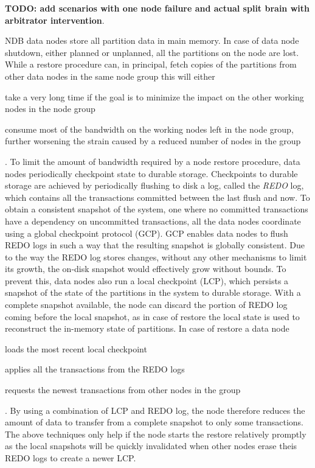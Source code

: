 \textbf{TODO: add scenarios with one node failure and actual split brain with arbitrator intervention}.

NDB data nodes store all partition data in main memory.
In case of data node shutdown, either planned or unplanned, all the partitions on the node are lost.
While a restore procedure can, in principal, fetch copies of the partitions from other data nodes in the same node group this will either \begin{inparaenum}[1)]
    \item take a very long time if the goal is to minimize the impact on the other working nodes in the node group
    \item consume most of the bandwidth on the working nodes left in the node group, further worsening the strain caused by a reduced number of nodes in the group
\end{inparaenum}.
To limit the amount of bandwidth required by a node restore procedure, data nodes periodically checkpoint state to durable storage.
Checkpoints to durable storage are achieved by periodically flushing to disk a log, called the \emph{REDO} log, which contains all the transactions committed between the last flush and now.
To obtain a consistent snapshot of the system, one where no committed transactions have a dependency on uncommitted transactions, all the data nodes coordinate using a global checkpoint protocol (GCP).
GCP enables data nodes to flush REDO logs in such a way that the resulting snapshot is globally consistent.
Due to the way the REDO log stores changes, without any other mechanisms to limit its growth, the on-disk snapshot would effectively grow without bounds.
To prevent this, data nodes also run a local checkpoint (LCP), which persists a snapshot of the state of the partitions in the system to durable storage.
With a complete snapshot available, the node can discard the portion of REDO log coming before the local snapshot, as in case of restore the local state is used to reconstruct the in-memory state of partitions.
In case of restore a data node \begin{inparaenum}[i)]
    \item loads the most recent local checkpoint
    \item applies all the transactions from the REDO logs
    \item requests the newest transactions from other nodes in the group
\end{inparaenum}.
By using a combination of LCP and REDO log, the node therefore reduces the amount of data to transfer from a complete snapshot to only some transactions.
The above techniques only help if the node starts the restore relatively promptly as the local snapshots will be quickly invalidated when other nodes erase theis REDO logs to create a newer LCP.

